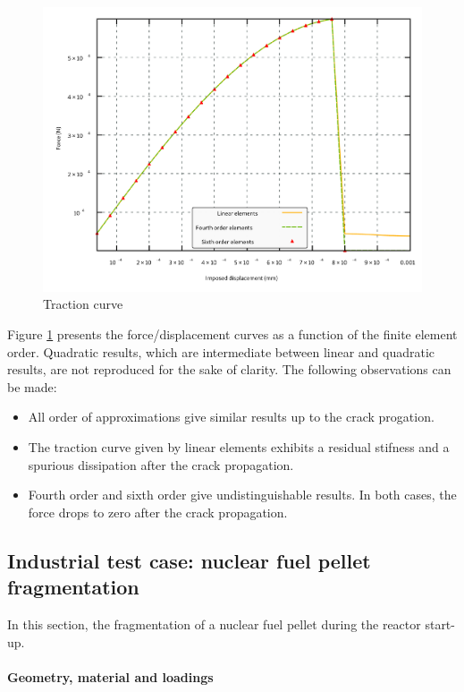 \begin{figure}[H]
  \centering
  \includegraphics[width=10.cm]{../chapter_003_ef_micromorphic/figures/shear-driven-fracture-damage-results-force.pdf}
  \caption{Traction curve}
  \label{fig:micromorphicdamage:traction_curve}
\end{figure}

Figure \ref{fig:micromorphicdamage:traction_curve} presents the
force/displacement curves as a function of the finite element order.
Quadratic results, which are intermediate between linear and quadratic
results, are not reproduced for the sake of clarity. The following
observations can be made:

\begin{itemize}
  \item All order of approximations give similar results up to the crack
  progation.
  \item The traction curve given by linear elements exhibits a residual
  stifness and a spurious dissipation after the crack propagation.
  \item Fourth order and sixth order give undistinguishable results. In both
  cases, the force drops to zero after the crack propagation.
\end{itemize}

\subsection{Industrial test case: nuclear fuel pellet fragmentation}

In this section, the fragmentation of a nuclear fuel pellet during the
reactor start-up. 

\paragraph{Geometry, material and loadings}

